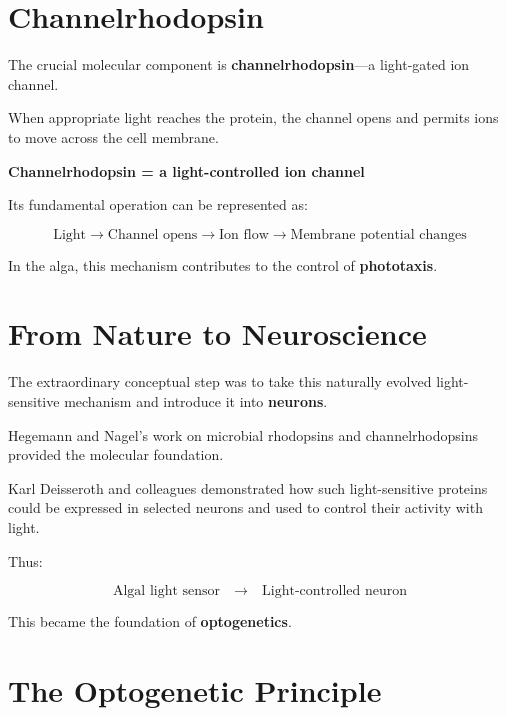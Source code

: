 \documentclass[11pt]{article}
\begin{document}
\section{Channelrhodopsin}

The crucial molecular component is
\textbf{channelrhodopsin}---a light-gated ion channel.

When appropriate light reaches the protein, the channel opens
and permits ions to move across the cell membrane.

\begin{conceptbox}
\begin{center}
{\color{SteelBlue}\Large\bfseries
Channelrhodopsin = a light-controlled ion channel}
\end{center}
\end{conceptbox}

Its fundamental operation can be represented as:

\begin{center}
\[
\boxed{
\text{Light}
\rightarrow
\text{Channel opens}
\rightarrow
\text{Ion flow}
\rightarrow
\text{Membrane potential changes}
}
\]
\end{center}

In the alga, this mechanism contributes to the control of
\textbf{phototaxis}.

\section{From Nature to Neuroscience}

The extraordinary conceptual step was to take this naturally
evolved light-sensitive mechanism and introduce it into
\textbf{neurons}.

Hegemann and Nagel's work on microbial rhodopsins and
channelrhodopsins provided the molecular foundation.

Karl Deisseroth and colleagues demonstrated how such
light-sensitive proteins could be expressed in selected neurons
and used to control their activity with light.

Thus:

\begin{center}
\[
\boxed{
\text{Algal light sensor}
\quad\longrightarrow\quad
\text{Light-controlled neuron}
}
\]
\end{center}

This became the foundation of \textbf{optogenetics}.

\section{The Optogenetic Principle}
\end{document}
